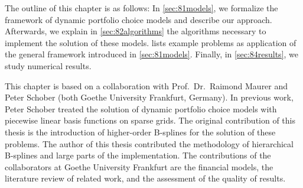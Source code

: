 The outline of this chapter is as follows:
In \cref{sec:81models}, we formalize the framework of
dynamic portfolio choice models and describe our approach.
Afterwards, we explain in \cref{sec:82algorithms} the algorithms
necessary to implement the solution of these models.
 lists example problems as application
of the general framework introduced in \cref{sec:81models}.
Finally, in \cref{sec:84results}, we study numerical results.

This chapter is based on a collaboration with Prof.\ Dr.\ Raimond Maurer
and Peter Schober (both Goethe University Frankfurt, Germany).
In previous work, Peter Schober treated the solution of
dynamic portfolio choice models with piecewise linear basis functions
on sparse grids.
The original contribution of this thesis is the introduction
of higher-order B-splines for the solution of these problems.
The author of this thesis contributed the methodology of
hierarchical B-splines and large parts of the implementation.
The contributions of the collaborators at Goethe University Frankfurt
are the financial models, the literature review of related work,
and the assessment of the quality of results.






\cleardoublepage
